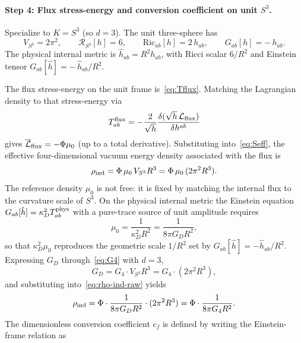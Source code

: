 \documentclass[11pt,a4paper]{article}
\begin{document}
\paragraph{Step 4: Flux stress-energy and conversion coefficient on unit \(S^3\).}
Specialize to \(K=S^3\) (so \(d=3\)). The unit three-sphere has
\begin{equation}
V_{S^3}=2\pi^2,\qquad \mathcal{R}_{S^3}[h]=6,\qquad
\mathrm{Ric}_{ab}[h]=2\,h_{ab},\qquad
G_{ab}[h]=-\,h_{ab}.
\label{eq:S3-geom}
\end{equation}
The physical internal metric is \(\hat h_{ab}=R^2 h_{ab}\), with Ricci scalar \(6/R^2\) and Einstein tensor \(G_{ab}[\hat h]=-\,\hat h_{ab}/R^2\).

The flux stress-energy on the unit frame is~\eqref{eq:Tflux}. Matching the Lagrangian density to that stress-energy via
\begin{equation}
T_{ab}^{\rm flux}=-\frac{2}{\sqrt{h}}\frac{\delta(\sqrt{h}\,\mathcal{L}_{\rm flux})}{\delta h^{ab}}
\end{equation}
gives \(\overline{\mathcal{L}}_{\rm flux}=-\Phi\mu_0\) (up to a total derivative). Substituting into~\eqref{eq:Seff}, the effective four-dimensional vacuum energy density associated with the flux is
\begin{equation}
\rho_{\rm ind}=\Phi\,\mu_0\,V_{S^3}R^3=\Phi\,\mu_0\,(2\pi^2 R^3).
\label{eq:rho-ind-raw}
\end{equation}
The reference density \(\mu_0\) is not free: it is fixed by matching the internal flux to the curvature scale of \(S^3\). On the physical internal metric the Einstein equation \(G_{ab}[\hat h]=\kappa_D^2 T_{ab}^{\rm phys}\) with a pure-trace source of unit amplitude requires
\begin{equation}
\mu_0=\frac{1}{\kappa_D^2 R^2}=\frac{1}{8\pi G_D R^2},
\label{eq:mu0}
\end{equation}
so that \(\kappa_D^2\mu_0\) reproduces the geometric scale \(1/R^2\) set by \(G_{ab}[\hat h]=-\hat h_{ab}/R^2\). Expressing \(G_D\) through~\eqref{eq:G4} with \(d=3\),
\begin{equation}
G_D=G_4\cdot V_{S^3}R^3=G_4\cdot(2\pi^2 R^3),
\end{equation}
and substituting into~\eqref{eq:rho-ind-raw} yields
\begin{equation}
\rho_{\rm ind}
=\Phi\cdot\frac{1}{8\pi G_D R^2}\cdot(2\pi^2 R^3)
=\Phi\cdot\frac{1}{8\pi G_4 R^2}.
\label{eq:rho-ind-leading}
\end{equation}
The dimensionless conversion coefficient \(c_f\) is defined by writing the Einstein-frame relation as
\end{document}
